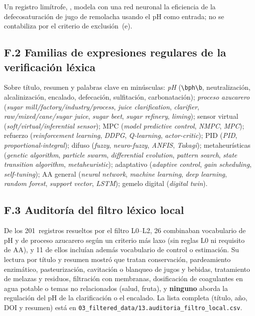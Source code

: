 \noindent Un registro limítrofe, \cite{vlasenko2023neural}, modela con una
red neuronal la eficiencia de la defecosaturación de jugo de remolacha
usando el pH como entrada; no se contabiliza por el criterio de
exclusión~(e).

\subsection*{F.2 Familias de expresiones regulares de la verificación léxica}

Sobre título, resumen y palabras clave en minúsculas:
\textit{pH} (\texttt{\textbackslash bph\textbackslash b}, neutralización,
alcalinización, encalado, defecación, sulfitación, carbonatación);
\textit{proceso azucarero} (\textit{sugar mill/factory/industry/process},
\textit{juice clarification}, \textit{clarifier}, \textit{raw/mixed/cane/sugar
juice}, \textit{sugar beet}, \textit{sugar refinery}, \textit{liming});
sensor virtual (\textit{soft/virtual/inferential sensor}); MPC
(\textit{model predictive control}, \textit{NMPC}, \textit{MPC});
refuerzo (\textit{reinforcement learning}, \textit{DDPG}, \textit{Q-learning},
\textit{actor-critic}); PID (\textit{PID}, \textit{proportional-integral});
difuso (\textit{fuzzy}, \textit{neuro-fuzzy}, \textit{ANFIS}, \textit{Takagi});
metaheurísticas (\textit{genetic algorithm}, \textit{particle swarm},
\textit{differential evolution}, \textit{pattern search}, \textit{state
transition algorithm}, \textit{metaheuristic}); adaptativo
(\textit{adaptive control}, \textit{gain scheduling}, \textit{self-tuning});
AA general (\textit{neural network}, \textit{machine learning}, \textit{deep
learning}, \textit{random forest}, \textit{support vector}, \textit{LSTM});
gemelo digital (\textit{digital twin}).

\subsection*{F.3 Auditoría del filtro léxico local}

De los 201~registros resueltos por el filtro L0--L2, 26 combinaban
vocabulario de pH y de proceso azucarero según un criterio más laxo
(sin reglas L0 ni requisito de AA), y 11 de ellos incluían además
vocabulario de control o estimación. Su lectura por título y resumen
mostró que tratan conservación, pardeamiento enzimático, pasteurización,
cavitación o blanqueo de jugos y bebidas, tratamiento de melazas y
residuos, filtración con membranas, dosificación de coagulantes en agua
potable o temas no relacionados (salud, fruta), y \textbf{ninguno}
aborda la regulación del pH de la clarificación o el encalado. La lista
completa (título, año, DOI y resumen) está en
\texttt{03\_filtered\_data/13.auditoria\_filtro\_local.csv}.
